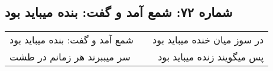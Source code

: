 \begin{center}
\section*{شماره ۷۲: شمع آمد و گفت: بنده میباید بود}
\label{sec:072}
\begin{longtable}{l p{0.5cm} r}
شمع آمد و گفت: بنده میباید بود
&&
در سوز میان خنده میباید بود
\\
سر میببرند هر زمانم در طشت
&&
پس میگویند زنده میباید بود
\\
\end{longtable}
\end{center}
